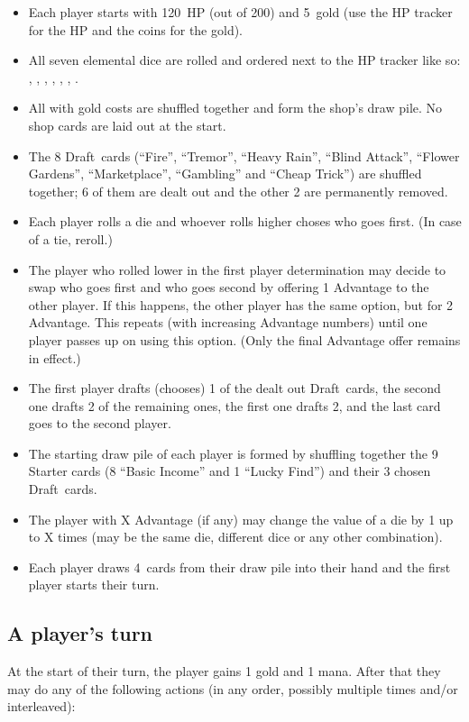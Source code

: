 \documentclass[dvipsnames,parskip,a4paper]{scrartcl}
\newcommand{\iconsize}{3.4mm}
\newcommand{\icondepth}{0.45mm}
\newcommand{\icon}[1]{\raisebox{-\icondepth}{\texttt{[image:  \#1 ]}}}
\newcommand{\fire}{\icon{icons/fire.png}}
\newcommand{\earth}{\icon{icons/earth.png}}
\newcommand{\water}{\icon{icons/water.png}}
\newcommand{\nature}{\icon{icons/nature.png}}
\newcommand{\magic}{\icon{icons/magic.png}}
\newcommand{\gold}{\icon{icons/gold.png}}
\newcommand{\chance}{\icon{icons/chance.png}}
\newcommand{\draft}{Draft}
\newcommand{\startgold}{5}
\newcommand{\handsize}{4}
\newcommand{\starthp}{120}
\begin{document}
\begin{itemize}
\item Each player starts with \starthp \ HP (out of 200) and \startgold \ gold (use the HP tracker for the HP and the coins for the gold).
\item All seven elemental dice are rolled and ordered next to the HP tracker like so: \fire, \earth, \water, \nature, \gold, \magic, \chance.
\item All with gold costs are shuffled together and form the shop's draw pile. No shop cards are laid out at the start.
\item The 8 \draft \ cards (``Fire'', ``Tremor'', ``Heavy Rain'', ``Blind Attack'', ``Flower Gardens'', ``Marketplace'', ``Gambling'' and ``Cheap Trick'') are shuffled together; 6 of them are dealt out and the other 2 are permanently removed.
\item Each player rolls a die and whoever rolls higher choses who goes first. (In case of a tie, reroll.)
\item The player who rolled lower in the first player determination may decide to swap who goes first and who goes second by offering 1 Advantage to the other player. If this happens, the other player has the same option, but for 2 Advantage. This repeats (with increasing Advantage numbers) until one player passes up on using this option. (Only the final Advantage offer remains in effect.)
\item The first player drafts (chooses) 1 of the dealt out \draft \ cards, the second one drafts 2 of the remaining ones, the first one drafts 2, and the last card goes to the second player.
\item The starting draw pile of each player is formed by shuffling together the 9 Starter cards (8 ``Basic Income'' and 1 ``Lucky Find'') and their 3 chosen \draft \ cards.
\item The player with X Advantage (if any) may change the value of a die by 1 up to X times (may be the same die, different dice or any other combination).
\item Each player draws \handsize \ cards from their draw pile into their hand and the first player starts their turn.
\end{itemize}

\subsection*{A player's turn}

At the start of their turn, the player gains 1 gold and 1 mana. After that they may do any of the following actions (in any order, possibly multiple times and/or interleaved):
\end{document}

